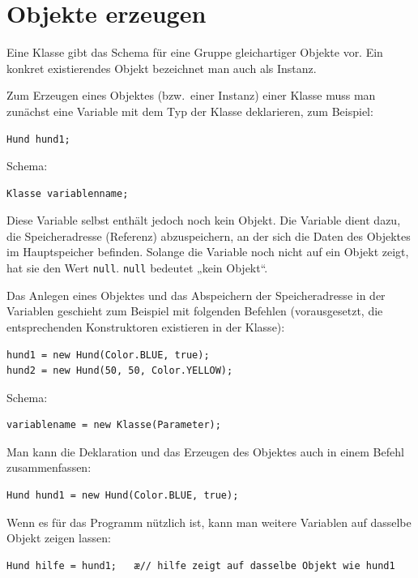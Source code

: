 \section{Objekte erzeugen}

Eine Klasse gibt das Schema für eine Gruppe gleichartiger Objekte vor. Ein
konkret existierendes Objekt bezeichnet man auch als Instanz.

Zum Erzeugen eines Objektes (bzw.\ einer Instanz) einer Klasse muss man zunächst
eine Variable mit dem Typ der Klasse deklarieren, zum Beispiel:

\begin{lstlisting}
Hund hund1;
\end{lstlisting}

Schema:

\begin{lstlisting}
Klasse variablenname;
\end{lstlisting}

Diese Variable selbst enthält jedoch noch kein Objekt. Die Variable dient dazu,
die Speicheradresse (Referenz) abzuspeichern, an der sich die Daten des Objektes im
Hauptspeicher befinden. Solange die Variable noch nicht auf ein Objekt zeigt,
hat sie den Wert \lstinline|null|. \lstinline|null| bedeutet „kein Objekt“.

Das Anlegen eines Objektes und das Abspeichern der Speicheradresse in der
Variablen geschieht zum Beispiel mit folgenden Befehlen (vorausgesetzt, die
entsprechenden Konstruktoren existieren in der Klasse):

\begin{lstlisting}
hund1 = new Hund(Color.BLUE, true);
hund2 = new Hund(50, 50, Color.YELLOW);
\end{lstlisting}

Schema:

\begin{lstlisting}
variablename = new Klasse(Parameter);
\end{lstlisting}

Man kann die Deklaration und das Erzeugen des Objektes auch in einem Befehl
zusammenfassen:

\begin{lstlisting}
Hund hund1 = new Hund(Color.BLUE, true);
\end{lstlisting}

Wenn es für das Programm nützlich ist, kann man weitere Variablen auf dasselbe
Objekt zeigen lassen:

\begin{lstlisting}
Hund hilfe = hund1;   æ// hilfe zeigt auf dasselbe Objekt wie hund1
\end{lstlisting}

